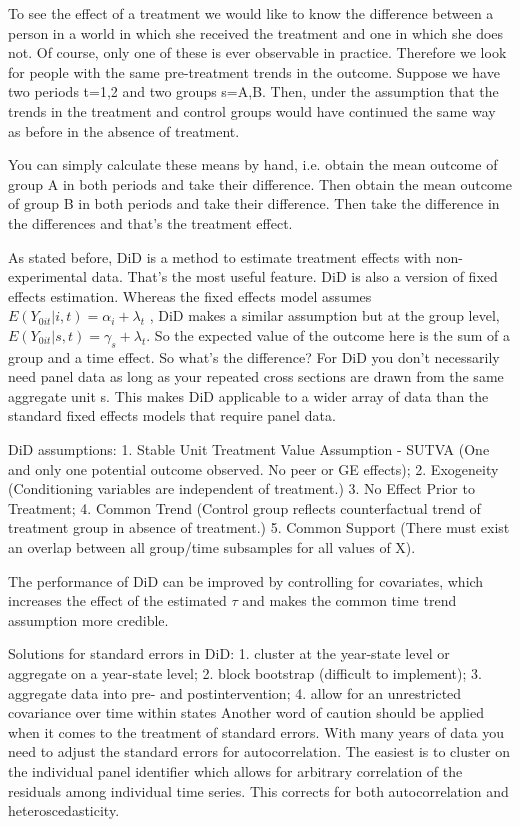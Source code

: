 \documentclass[7pt, a4paper]{article}
\begin{document}
\begin{multicols*}{3}
To see the effect of a treatment we would like to know the difference between a person in a world in which she received the treatment and one in which she does not. Of course, only one of these is ever observable in practice. Therefore we look for people with the same pre-treatment trends in the outcome. Suppose we have two periods t=1,2
and two groups s=A,B. Then, under the assumption that the trends in the treatment and control groups would have continued the same way as before in the absence of treatment.

You can simply calculate these means by hand, i.e. obtain the mean outcome of group A in both periods and take their difference. Then obtain the mean outcome of group B in both periods and take their difference. Then take the difference in the differences and that's the treatment effect.

As stated before, DiD is a method to estimate treatment effects with non-experimental data. That's the most useful feature. DiD is also a version of fixed effects estimation. Whereas the fixed effects model assumes $E(Y_{0it}|i,t)=\alpha_i+\lambda_t$
, DiD makes a similar assumption but at the group level, $E(Y_{0it}|s,t)=\gamma_s+\lambda_t$. So the expected value of the outcome here is the sum of a group and a time effect. So what's the difference? For DiD you don't necessarily need panel data as long as your repeated cross sections are drawn from the same aggregate unit s. This makes DiD applicable to a wider array of data than the standard fixed effects models that require panel data.

DiD assumptions: 1. Stable Unit Treatment Value Assumption -
SUTVA (One and only one potential outcome observed. No peer or GE effects); 2. Exogeneity (Conditioning variables are independent of treatment.) 3. No Effect Prior to Treatment; 4. Common Trend (Control group reflects counterfactual trend of treatment group in absence of treatment.) 5. Common Support (There must exist an overlap between all group/time subsamples for all values of X).

The performance of DiD can be improved by controlling for covariates, which increases the effect of the estimated $\tau$ and makes the common time trend assumption more credible.

Solutions for standard errors in DiD: 1. cluster at the year-state level or aggregate on a year-state level; 2. block bootstrap (difficult to implement); 3. aggregate data into pre- and postintervention; 4. allow for an unrestricted covariance over time within states
Another word of caution should be applied when it comes to the treatment of standard errors. With many years of data you need to adjust the standard errors for autocorrelation. The easiest is to cluster on the individual panel identifier which allows for arbitrary correlation of the residuals among individual time series. This corrects for both autocorrelation and heteroscedasticity.


\end{multicols*}
\end{document}
